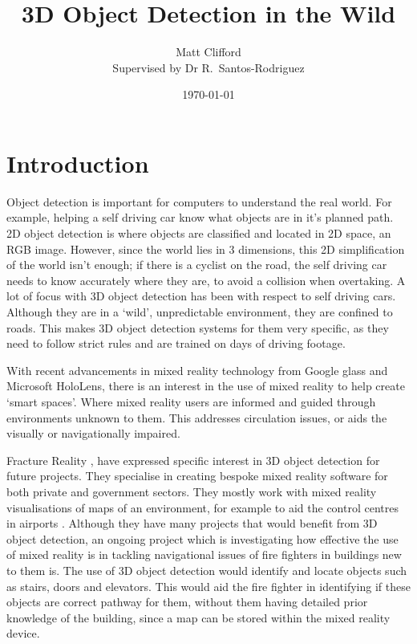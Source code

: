 \documentclass[11pt]{article}
\title{3D Object Detection in the Wild}
\author{Matt Clifford \\ Supervised by Dr R.\ Santos-Rodriguez}
\date{\today}
\begin{document}
\maketitle

\section{Introduction}
Object detection is important for computers to understand the real world. For example, helping a self driving car know what objects are in it's planned path. 2D object detection is where objects are classified and located in 2D space, an RGB image. However, since the world lies in 3 dimensions, this 2D simplification of the world isn't enough; if there is a cyclist on the road, the self driving car needs to know accurately where they are, to avoid a collision when overtaking. A lot of focus with 3D object detection has been with respect to self driving cars. Although they are in a `wild', unpredictable environment, they are confined to roads. This makes 3D object detection systems for them very specific, as they need to follow strict rules and are trained on days of driving footage. 

With recent advancements in mixed reality technology from Google glass and Microsoft HoloLens, there is an interest in the use of mixed reality to help create `smart spaces'. Where mixed reality users are informed and guided through environments unknown to them. This addresses circulation issues, or aids the visually or navigationally impaired.

Fracture Reality \cite{fracture}, have expressed specific interest in 3D object detection for future projects. They specialise in creating bespoke mixed reality software for both private and government sectors. They mostly work with mixed reality visualisations of maps of an environment, for example to aid the control centres in airports \cite{youtube}. Although they have many projects that would benefit from 3D object detection, an ongoing project which is investigating how effective the use of mixed reality is in tackling navigational issues of fire fighters in buildings new to them is. The use of 3D object detection would identify and locate objects such as stairs, doors and elevators. This would aid the fire fighter in identifying if these objects are correct pathway for them, without them having detailed prior knowledge of the building, since a map can be stored within the mixed reality device.
\end{document}
